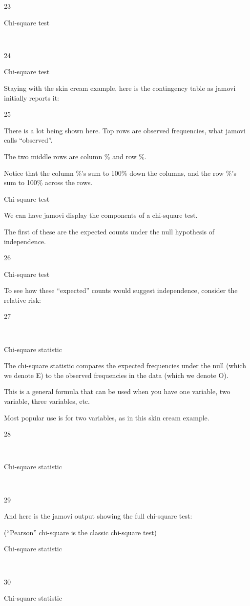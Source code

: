 \documentclass[
  letterpaper,
  DIV=11,
  numbers=noendperiod]{scrreprt}
\begin{document}
23

Chi-square test

~

24

Chi-square test

Staying with the skin cream example, here is the contingency table as
jamovi initially reports it:

25

There is a lot being shown here. Top rows are observed frequencies, what
jamovi calls ``observed''.

The two middle rows are column \% and row \%.

Notice that the column \%'s sum to 100\% down the columns, and the row
\%'s sum to 100\% across the rows.

Chi-square test

We can have jamovi display the components of a chi-square test.

The first of these are the expected counts under the null hypothesis of
independence.

26

Chi-square test

To see how these ``expected'' counts would suggest independence,
consider the relative risk:

27

~

Chi-square statistic

The chi-square statistic compares the expected frequencies under the
null (which we denote E) to the observed frequencies in the data (which
we denote O).

This is a general formula that can be used when you have one variable,
two variable, three variables, etc.

Most popular use is for two variables, as in this skin cream example.

28

~

Chi-square statistic

~

29

And here is the jamovi output showing the full chi-square test:

(``Pearson'' chi-square is the classic chi-square test)

Chi-square statistic

~

30

Chi-square statistic

~
\end{document}
